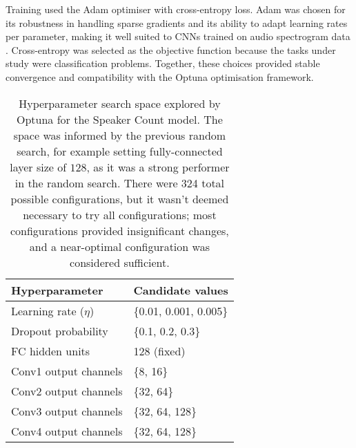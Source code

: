 Training used the Adam optimiser with cross-entropy loss. Adam was chosen for its robustness in handling sparse gradients and its ability to adapt learning rates per parameter, making it well suited to CNNs trained on audio spectrogram data \cite{adam}. Cross-entropy was selected as the objective function because the tasks under study were classification problems. Together, these choices provided stable convergence and compatibility with the Optuna optimisation framework.


\begin{table}[H]
\label{tab:optuna_search_space}
\centering
\caption{Hyperparameter search space explored by Optuna for the Speaker Count model. The space was informed by the previous random search, for example setting fully-connected layer size of $128$, as it was a strong performer in the random search. There were 324 total possible configurations, but it wasn't deemed necessary to try all configurations; most configurations provided insignificant changes, and a near-optimal configuration was considered sufficient.}
\begin{tabular}{ll}
\hline
Hyperparameter & Candidate values \\
\hline
Learning rate ($\eta$) & \{0.01, 0.001, 0.005\} \\
Dropout probability & \{0.1, 0.2, 0.3\} \\
FC hidden units & 128 (fixed) \\
Conv1 output channels & \{8, 16\} \\
Conv2 output channels & \{32, 64\} \\
Conv3 output channels & \{32, 64, 128\} \\
Conv4 output channels & \{32, 64, 128\} \\
\hline
\end{tabular}
\label{tab:optuna_space}
\end{table}


